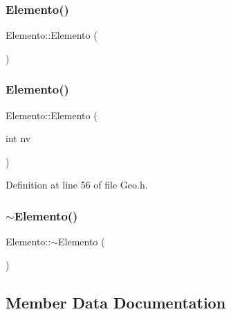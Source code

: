 \subsubsection{\texorpdfstring{Elemento()}{Elemento()}\hspace{0.1cm}{\footnotesize\ttfamily [1/2]}}
{\footnotesize\ttfamily Elemento\+::\+Elemento (\begin{DoxyParamCaption}{ }\end{DoxyParamCaption})}

\mbox{\label{structElemento_a325d9d7ed38643b0669d584604c89f15}} 
\subsubsection{\texorpdfstring{Elemento()}{Elemento()}\hspace{0.1cm}{\footnotesize\ttfamily [2/2]}}
{\footnotesize\ttfamily Elemento\+::\+Elemento (\begin{DoxyParamCaption}\item[{int}]{nv }\end{DoxyParamCaption})\hspace{0.3cm}{\ttfamily [inline]}}



Definition at line 56 of file Geo.\+h.

\mbox{\label{structElemento_af49135626b9f2b5e50d93fb36620e359}} 
\subsubsection{\texorpdfstring{$\sim$\+Elemento()}{~Elemento()}}
{\footnotesize\ttfamily Elemento\+::$\sim$\+Elemento (\begin{DoxyParamCaption}{ }\end{DoxyParamCaption})}



\subsection{Member Data Documentation}
\mbox{\label{structElemento_ad35819e9864802ac413d0ff3db31f3c6}} 
